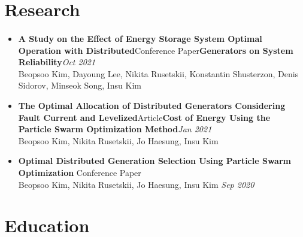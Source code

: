 \documentclass[10pt]{article}
\begin{document}

\section{Research}
\paragraph{}

\begin{itemize}[itemsep=5pt,topsep=0pt]
    \item \normalsize{\textbf{A Study on the Effect of Energy Storage System Optimal Operation with Distributed}\normalsize{\hfill Conference Paper}\newline\textbf{Generators on System Reliability}}\hfill \textit{Oct 2021}
    \\    \normalsize{Beopsoo Kim, Dayoung Lee, Nikita Rusetskii, Konstantin Shusterzon, Denis Sidorov, Minseok Song, Insu Kim}
    \item \normalsize{\textbf{The Optimal Allocation of Distributed Generators Considering Fault Current and Levelized}\normalsize{\hfill Article}\newline\textbf{Cost of Energy Using the Particle Swarm Optimization Method}}\hfill \textit{Jan 2021}
    \\    \normalsize{Beopsoo Kim, Nikita Rusetskii, Jo Haesung, Insu Kim}
    \item \normalsize{\textbf{Optimal Distributed Generation Selection Using Particle Swarm Optimization}} \normalsize{\hfill Conference Paper
    \\    \normalsize{Beopsoo Kim, Nikita Rusetskii, Jo Haesung, Insu Kim} \hfill \textit{Sep 2020}}
        \end{itemize}


\section{Education}
\paragraph{}
\end{document}
